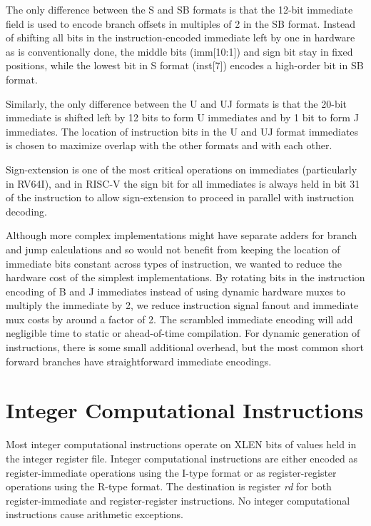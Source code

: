 The only difference between the S and SB formats is that the 12-bit
immediate field is used to encode branch offsets in multiples of 2 in
the SB format.  Instead of shifting all bits in the
instruction-encoded immediate left by one in hardware as is
conventionally done, the middle bits (imm[10:1]) and sign bit stay in
fixed positions, while the lowest bit in S format (inst[7]) encodes a
high-order bit in SB format.

Similarly, the only difference between the U and UJ formats is
that the 20-bit immediate is shifted left by 12 bits to form U
immediates and by 1 bit to form J immediates.  The location of
instruction bits in the U and UJ format immediates is chosen to
maximize overlap with the other formats and with each other.

\begin{commentary}
Sign-extension is one of the most critical operations on immediates
(particularly in RV64I), and in RISC-V the sign bit for all immediates
is always held in bit 31 of the instruction to allow sign-extension to
proceed in parallel with instruction decoding.

Although more complex implementations might have separate adders for
branch and jump calculations and so would not benefit from keeping the
location of immediate bits constant across types of instruction, we
wanted to reduce the hardware cost of the simplest implementations.
By rotating bits in the instruction encoding of B and J immediates
instead of using dynamic hardware muxes to multiply the immediate by
2, we reduce instruction signal fanout and immediate mux costs by
around a factor of 2.  The scrambled immediate encoding will add
negligible time to static or ahead-of-time compilation.  For dynamic
generation of instructions, there is some small additional
overhead, but the most common short forward branches have
straightforward immediate encodings.
\end{commentary}

\section{Integer Computational Instructions}

Most integer computational instructions operate on XLEN bits of values
held in the integer register file.  Integer computational instructions
are either encoded as register-immediate operations using the I-type
format or as register-register operations using the R-type format.
The destination is register {\em rd} for both register-immediate and
register-register instructions.  No integer computational instructions
cause arithmetic exceptions.

